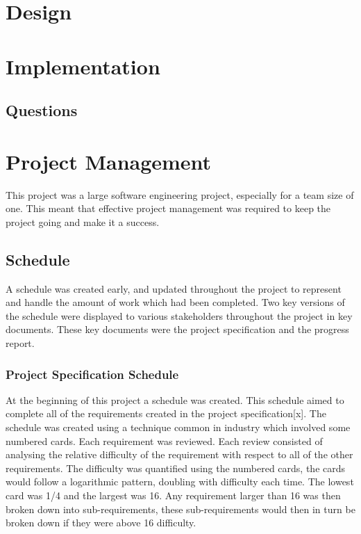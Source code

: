 \documentclass{article}
\begin{document}

\section{Design}




\section{Implementation}

\subsection{Questions}



\section{Project Management}

This project was a large software engineering project, especially for a team size of one. This meant that effective project management was required to keep the project going and make it a success. 

\subsection{Schedule}

A schedule was created early, and updated throughout the project to represent and handle the amount of work which had been completed. Two key versions of the schedule were displayed to various stakeholders throughout the project in key documents. These key documents were the project specification and the progress report. 

\subsubsection{Project Specification Schedule}

At the beginning of this project a schedule was created. This schedule aimed to complete all of the requirements created in the project specification[x]. The schedule was created using a technique common in industry which involved some numbered cards. Each requirement was reviewed. Each review consisted of analysing the relative difficulty of the requirement with respect to all of the other requirements. The difficulty was quantified using the numbered cards, the cards would follow a logarithmic pattern, doubling with difficulty each time. The lowest card was 1/4 and the largest was 16. Any requirement larger than 16 was then broken down into sub-requirements, these sub-requirements would then in turn be broken down if they were above 16 difficulty. \\
\end{document}

